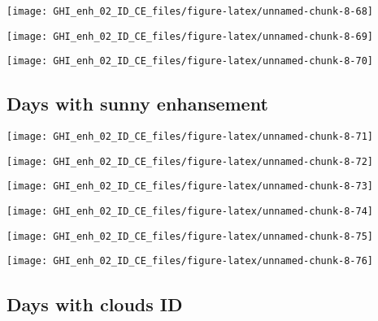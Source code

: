\documentclass[
  10pt,
  a4paper,oneside]{article}
\begin{document}
\begin{center}\texttt{[image: GHI\_enh\_02\_ID\_CE\_files/figure-latex/unnamed-chunk-8-68]} \end{center}

\begin{center}\texttt{[image: GHI\_enh\_02\_ID\_CE\_files/figure-latex/unnamed-chunk-8-69]} \end{center}

\begin{center}\texttt{[image: GHI\_enh\_02\_ID\_CE\_files/figure-latex/unnamed-chunk-8-70]} \end{center}

\FloatBarrier

\hypertarget{days-with-sunny-enhansement}{%
\subsection{Days with sunny enhansement}\label{days-with-sunny-enhansement}}

\begin{center}\texttt{[image: GHI\_enh\_02\_ID\_CE\_files/figure-latex/unnamed-chunk-8-71]} \end{center}

\begin{center}\texttt{[image: GHI\_enh\_02\_ID\_CE\_files/figure-latex/unnamed-chunk-8-72]} \end{center}

\begin{center}\texttt{[image: GHI\_enh\_02\_ID\_CE\_files/figure-latex/unnamed-chunk-8-73]} \end{center}

\begin{center}\texttt{[image: GHI\_enh\_02\_ID\_CE\_files/figure-latex/unnamed-chunk-8-74]} \end{center}

\begin{center}\texttt{[image: GHI\_enh\_02\_ID\_CE\_files/figure-latex/unnamed-chunk-8-75]} \end{center}

\begin{center}\texttt{[image: GHI\_enh\_02\_ID\_CE\_files/figure-latex/unnamed-chunk-8-76]} \end{center}

\FloatBarrier

\hypertarget{days-with-clouds-id}{%
\subsection{Days with clouds ID}\label{days-with-clouds-id}}
\end{document}
